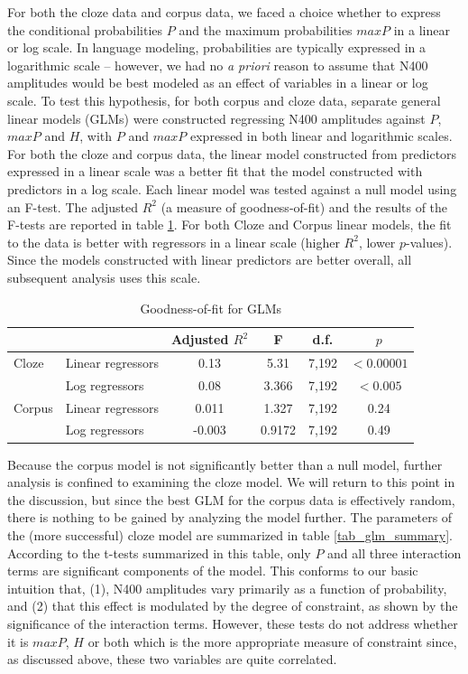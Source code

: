 \documentclass{article}
\begin{document}
For both the cloze data and corpus data, we faced a choice whether to express the conditional probabilities $P$ and the maximum probabilities $maxP$ in a linear or log scale. In language modeling, probabilities are typically expressed in a logarithmic scale -- however, we had no \emph{a priori} reason to assume that N400 amplitudes would be best modeled as an effect of variables in a linear or log scale. To test this hypothesis, for both corpus and cloze data, separate general linear models (GLMs) were constructed regressing N400 amplitudes against $P$, $maxP$ and $H$, with $P$ and $maxP$ expressed in both linear and logarithmic scales. For both the cloze and corpus data, the linear model constructed from predictors expressed in a linear scale was a better fit that the model constructed with predictors in a log scale. Each linear model was tested against a null model using an F-test. The adjusted $R^2$ (a measure of goodness-of-fit) and the results of the F-tests are reported in table \ref{tab_gof}. For both Cloze and Corpus linear models, the fit to the data is better with regressors in a linear scale (higher $R^2$, lower $p$-values). Since the models constructed with linear predictors are better overall, all subsequent analysis uses this scale.


\begin{table}
	\centering
	\caption{Goodness-of-fit for GLMs \label{tab_gof}}
	\begin{tabular}{ll|cccc}
		&						&	Adjusted $R^2$	&	F	&	d.f.	&	$p$\\
        \hline
        \hline
Cloze	&	Linear regressors	&	0.13			&	5.31 &	7,192 & $<0.00001$\\
		&	Log regressors		&	0.08			&	3.366 & 7,192 & $<0.005$\\
\hline
Corpus	&	Linear regressors	&	0.011			&	1.327 & 7,192 & 0.24\\
		&	Log regressors		&	-0.003			&	0.9172	& 7,192 & 0.49
	\end{tabular}
\end{table}


Because the corpus model is not significantly better than a null model, further analysis is confined to examining the cloze model. We will return to this point in the discussion, but since the best GLM for the corpus data is effectively random, there is nothing to be gained by analyzing the model further. The parameters of the (more successful) cloze model are summarized in table \ref{tab_glm_summary}. According to the t-tests summarized in this table, only $P$ and all three interaction terms are significant components of the model. This conforms to our basic intuition that, (1), N400 amplitudes vary primarily as a function of probability, and (2) that this effect is modulated by the degree of constraint, as shown by the significance of the interaction terms. However, these tests do not address whether it is $maxP$, $H$ or both which is the more appropriate measure of constraint since, as discussed above, these two variables are quite correlated. 
\end{document}
